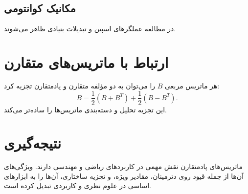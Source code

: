 \subsection*{مکانیک کوانتومی}
در مطالعه عملگرهای اسپین و تبدیلات بنیادی ظاهر می‌شوند.

\section*{ارتباط با ماتریس‌های متقارن}
هر ماتریس مربعی $B$ را می‌توان به دو مؤلفه متقارن و پادمتقارن تجزیه کرد:
\begin{equation}
	B = \frac{1}{2}(B + B^T) + \frac{1}{2}(B - B^T).
\end{equation}
این تجزیه تحلیل و دسته‌بندی ماتریس‌ها را ساده‌تر می‌کند.

\section*{نتیجه‌گیری}
ماتریس‌های پادمتقارن نقش مهمی در کاربردهای ریاضی و مهندسی دارند. ویژگی‌های آن‌ها از جمله قیود روی دترمینان، مقادیر ویژه، و تجزیه ساختاری، آن‌ها را به ابزارهای اساسی در علوم نظری و کاربردی تبدیل کرده است.
